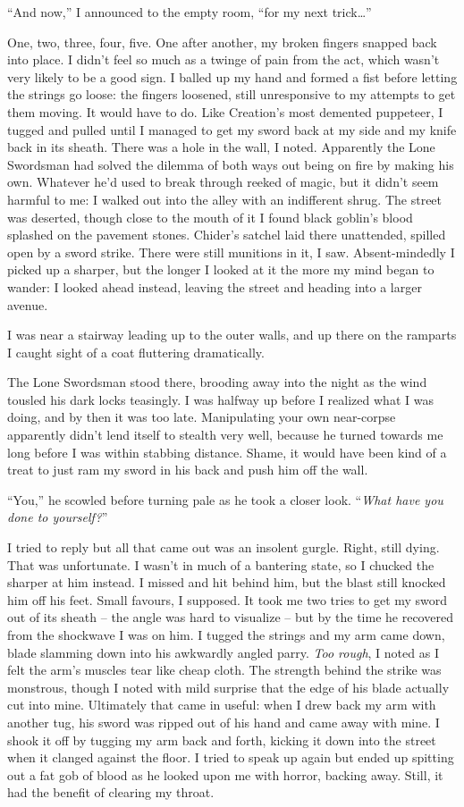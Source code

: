 \documentclass[12pt, openany]{book}
\begin{document}
“And now,” I announced to the empty room, “for my next trick…”

One, two, three, four, five. One after another, my broken fingers snapped back into place. I didn’t feel so much as a twinge of pain from the act, which wasn’t very likely to be a good sign. I balled up my hand and formed a fist before letting the strings go loose: the fingers loosened, still unresponsive to my attempts to get them moving. It would have to do. Like Creation’s most demented puppeteer, I tugged and pulled until I managed to get my sword back at my side and my knife back in its sheath. There was a hole in the wall, I noted. Apparently the Lone Swordsman had solved the dilemma of both ways out being on fire by making his own. Whatever he’d used to break through reeked of magic, but it didn’t seem harmful to me: I walked out into the alley with an indifferent shrug. The street was deserted, though close to the mouth of it I found black goblin’s blood splashed on the pavement stones. Chider’s satchel laid there unattended, spilled open by a sword strike. There were still munitions in it, I saw. Absent-mindedly I picked up a sharper, but the longer I looked at it the more my mind began to wander: I looked ahead instead, leaving the street and heading into a larger avenue.

I was near a stairway leading up to the outer walls, and up there on the ramparts I caught sight of a coat fluttering dramatically.

The Lone Swordsman stood there, brooding away into the night as the wind tousled his dark locks teasingly. I was halfway up before I realized what I was doing, and by then it was too late. Manipulating your own near-corpse apparently didn’t lend itself to stealth very well, because he turned towards me long before I was within stabbing distance. Shame, it would have been kind of a treat to just ram my sword in his back and push him off the wall.

“You,” he scowled before turning pale as he took a closer look. “\textit{What have you done to yourself?}”

I tried to reply but all that came out was an insolent gurgle. Right, still dying. That was unfortunate. I wasn’t in much of a bantering state, so I chucked the sharper at him instead. I missed and hit behind him, but the blast still knocked him off his feet. Small favours, I supposed. It took me two tries to get my sword out of its sheath – the angle was hard to visualize – but by the time he recovered from the shockwave I was on him. I tugged the strings and my arm came down, blade slamming down into his awkwardly angled parry. \textit{Too rough}, I noted as I felt the arm’s muscles tear like cheap cloth. The strength behind the strike was monstrous, though I noted with mild surprise that the edge of his blade actually cut into mine. Ultimately that came in useful: when I drew back my arm with another tug, his sword was ripped out of his hand and came away with mine. I shook it off by tugging my arm back and forth, kicking it down into the street when it clanged against the floor. I tried to speak up again but ended up spitting out a fat gob of blood as he looked upon me with horror, backing away. Still, it had the benefit of clearing my throat.
\end{document}
